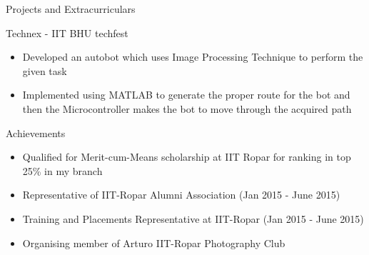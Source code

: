 \documentclass{article}
\newlength{\tabin}
\newlength{\secsep}
\newcommand{\lineunder}{\vspace*{-8pt} \\ \hspace*{-6pt} \hrulefill \\ \vspace*{-15pt}}
\newenvironment{tabbedsection}[1]{
  \begin{list}{}{
      \setlength{\itemsep}{0pt}
      \setlength{\labelsep}{0pt}
      \setlength{\labelwidth}{0pt}
      \setlength{\leftmargin}{\tabin}
      \setlength{\rightmargin}{\tabin}
      \setlength{\listparindent}{0pt}
      \setlength{\parsep}{0pt}
      \setlength{\parskip}{0pt}
      \setlength{\partopsep}{0pt}
      \setlength{\topsep}{#1}
    }
  \item[]
}{\end{list}}
\newenvironment{resume_section}[1]{
  \filbreak
  \vspace{2\secsep}
  \textsc{\large#1}
  \lineunder
  \begin{tabbedsection}{\secsep}
}{\end{tabbedsection}}
\newenvironment{resume_subsection}[2][]{
  \textbf{#2} \hfill {\footnotesize #1} \hspace{2em}
  \begin{tabbedsection}{0.5\secsep}
}{\end{tabbedsection}}
\newenvironment{subitems}{
  \renewcommand{\labelitemi}{-}
  \begin{itemize}
      \setlength{\labelsep}{1em}
}{\end{itemize}}
\begin{document}
\begin{resume_section}{Projects and Extracurriculars}
  \begin{resume_subsection}[(March 2014)]{Technex - IIT BHU techfest}
  \begin{subitems}
    \item Developed an autobot which uses Image Processing Technique to perform the given task
    \item Implemented using MATLAB to generate the proper route for the bot and then the Microcontroller makes the bot to move through the acquired path
    \end{subitems}
  \end{resume_subsection}
  
  \begin{resume_subsection}{Achievements}
  \begin{subitems}
    \item Qualified for Merit-cum-Means scholarship at IIT Ropar for ranking in top 25\% in my
branch
    \item Representative of IIT-Ropar Alumni Association (Jan 2015 - June 2015)
    \item Training and Placements Representative at IIT-Ropar (Jan 2015 - June 2015)
    \item Organising member of Arturo IIT-Ropar Photography Club
    \end{subitems}
  \end{resume_subsection}
\end{resume_section}
\end{document}
